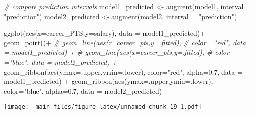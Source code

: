 \documentclass[
]{book}
\newenvironment{Shaded}{\begin{snugshade}}{\end{snugshade}}
\newcommand{\AttributeTok}[1]{\textcolor[rgb]{0.77,0.63,0.00}{#1}}
\newcommand{\CommentTok}[1]{\textcolor[rgb]{0.56,0.35,0.01}{\textit{#1}}}
\newcommand{\FloatTok}[1]{\textcolor[rgb]{0.00,0.00,0.81}{#1}}
\newcommand{\FunctionTok}[1]{\textcolor[rgb]{0.00,0.00,0.00}{#1}}
\newcommand{\NormalTok}[1]{#1}
\newcommand{\OtherTok}[1]{\textcolor[rgb]{0.56,0.35,0.01}{#1}}
\newcommand{\SpecialCharTok}[1]{\textcolor[rgb]{0.00,0.00,0.00}{#1}}
\newcommand{\StringTok}[1]{\textcolor[rgb]{0.31,0.60,0.02}{#1}}
\begin{document}
\begin{Shaded}
\begin{Highlighting}[]
\CommentTok{\# compare prediction intervals}
\NormalTok{model1\_predicted }\OtherTok{\textless{}{-}} \FunctionTok{augment}\NormalTok{(model1, }\AttributeTok{interval =} \StringTok{"prediction"}\NormalTok{)}
\NormalTok{model2\_predicted }\OtherTok{\textless{}{-}} \FunctionTok{augment}\NormalTok{(model2, }\AttributeTok{interval =} \StringTok{"prediction"}\NormalTok{)}

  \FunctionTok{ggplot}\NormalTok{(}\FunctionTok{aes}\NormalTok{(}\AttributeTok{x=}\NormalTok{career\_PTS,}\AttributeTok{y=}\NormalTok{salary), }\AttributeTok{data =}\NormalTok{ model1\_predicted)}\SpecialCharTok{+}
  \FunctionTok{geom\_point}\NormalTok{()}\SpecialCharTok{+}
  \CommentTok{\# geom\_line(aes(x=career\_pts,y=.fitted),}
  \CommentTok{\#           color ="red", data = model1\_predicted) +}
  \CommentTok{\# geom\_line(aes(x=career\_pts,y=.fitted),}
  \CommentTok{\#          color ="blue", data = model2\_predicted) +}
  \FunctionTok{geom\_ribbon}\NormalTok{(}\FunctionTok{aes}\NormalTok{(}\AttributeTok{ymax=}\NormalTok{.upper,}\AttributeTok{ymin=}\NormalTok{.lower),}
              \AttributeTok{color=}\StringTok{"red"}\NormalTok{,}
              \AttributeTok{alpha=}\FloatTok{0.7}\NormalTok{,}
              \AttributeTok{data =}\NormalTok{ model1\_predicted) }\SpecialCharTok{+}
  \FunctionTok{geom\_ribbon}\NormalTok{(}\FunctionTok{aes}\NormalTok{(}\AttributeTok{ymax=}\NormalTok{.upper,}\AttributeTok{ymin=}\NormalTok{.lower),}
              \AttributeTok{color=}\StringTok{"blue"}\NormalTok{,}
              \AttributeTok{alpha=}\FloatTok{0.7}\NormalTok{,}
              \AttributeTok{data =}\NormalTok{ model2\_predicted)}
\end{Highlighting}
\end{Shaded}

\texttt{[image: \_main\_files/figure-latex/unnamed-chunk-19-1.pdf]}

\begin{Shaded}
\end{Shaded}
\end{document}
